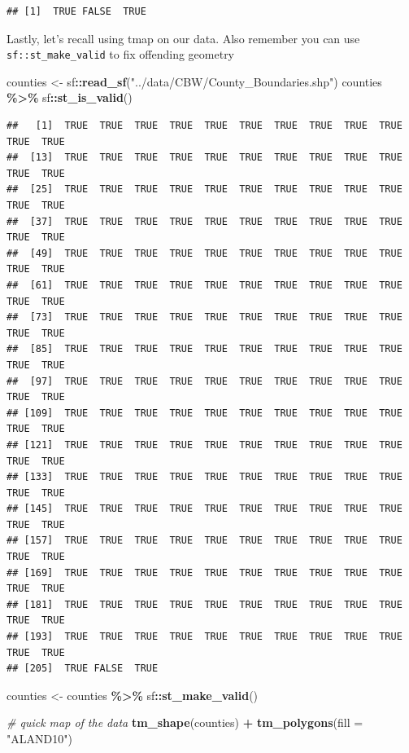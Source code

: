 \documentclass[]{article}
\newenvironment{Shaded}{\begin{snugshade}}{\end{snugshade}}
\newcommand{\AttributeTok}[1]{\textcolor[rgb]{0.13,0.29,0.53}{#1}}
\newcommand{\CommentTok}[1]{\textcolor[rgb]{0.56,0.35,0.01}{\textit{#1}}}
\newcommand{\FunctionTok}[1]{\textcolor[rgb]{0.13,0.29,0.53}{\textbf{#1}}}
\newcommand{\NormalTok}[1]{#1}
\newcommand{\OtherTok}[1]{\textcolor[rgb]{0.56,0.35,0.01}{#1}}
\newcommand{\SpecialCharTok}[1]{\textcolor[rgb]{0.81,0.36,0.00}{\textbf{#1}}}
\newcommand{\StringTok}[1]{\textcolor[rgb]{0.31,0.60,0.02}{#1}}
\begin{document}
\begin{verbatim}
## [1]  TRUE FALSE  TRUE
\end{verbatim}

Lastly, let's recall using tmap on our data. Also remember you can use
\texttt{sf::st\_make\_valid} to fix offending geometry

\begin{Shaded}
\begin{Highlighting}[]
\NormalTok{counties }\OtherTok{\textless{}{-}}\NormalTok{ sf}\SpecialCharTok{::}\FunctionTok{read\_sf}\NormalTok{(}\StringTok{"../data/CBW/County\_Boundaries.shp"}\NormalTok{)}
\NormalTok{counties }\SpecialCharTok{\%\textgreater{}\%}\NormalTok{ sf}\SpecialCharTok{::}\FunctionTok{st\_is\_valid}\NormalTok{()}
\end{Highlighting}
\end{Shaded}

\begin{verbatim}
##   [1]  TRUE  TRUE  TRUE  TRUE  TRUE  TRUE  TRUE  TRUE  TRUE  TRUE  TRUE  TRUE
##  [13]  TRUE  TRUE  TRUE  TRUE  TRUE  TRUE  TRUE  TRUE  TRUE  TRUE  TRUE  TRUE
##  [25]  TRUE  TRUE  TRUE  TRUE  TRUE  TRUE  TRUE  TRUE  TRUE  TRUE  TRUE  TRUE
##  [37]  TRUE  TRUE  TRUE  TRUE  TRUE  TRUE  TRUE  TRUE  TRUE  TRUE  TRUE  TRUE
##  [49]  TRUE  TRUE  TRUE  TRUE  TRUE  TRUE  TRUE  TRUE  TRUE  TRUE  TRUE  TRUE
##  [61]  TRUE  TRUE  TRUE  TRUE  TRUE  TRUE  TRUE  TRUE  TRUE  TRUE  TRUE  TRUE
##  [73]  TRUE  TRUE  TRUE  TRUE  TRUE  TRUE  TRUE  TRUE  TRUE  TRUE  TRUE  TRUE
##  [85]  TRUE  TRUE  TRUE  TRUE  TRUE  TRUE  TRUE  TRUE  TRUE  TRUE  TRUE  TRUE
##  [97]  TRUE  TRUE  TRUE  TRUE  TRUE  TRUE  TRUE  TRUE  TRUE  TRUE  TRUE  TRUE
## [109]  TRUE  TRUE  TRUE  TRUE  TRUE  TRUE  TRUE  TRUE  TRUE  TRUE  TRUE  TRUE
## [121]  TRUE  TRUE  TRUE  TRUE  TRUE  TRUE  TRUE  TRUE  TRUE  TRUE  TRUE  TRUE
## [133]  TRUE  TRUE  TRUE  TRUE  TRUE  TRUE  TRUE  TRUE  TRUE  TRUE  TRUE  TRUE
## [145]  TRUE  TRUE  TRUE  TRUE  TRUE  TRUE  TRUE  TRUE  TRUE  TRUE  TRUE  TRUE
## [157]  TRUE  TRUE  TRUE  TRUE  TRUE  TRUE  TRUE  TRUE  TRUE  TRUE  TRUE  TRUE
## [169]  TRUE  TRUE  TRUE  TRUE  TRUE  TRUE  TRUE  TRUE  TRUE  TRUE  TRUE  TRUE
## [181]  TRUE  TRUE  TRUE  TRUE  TRUE  TRUE  TRUE  TRUE  TRUE  TRUE  TRUE  TRUE
## [193]  TRUE  TRUE  TRUE  TRUE  TRUE  TRUE  TRUE  TRUE  TRUE  TRUE  TRUE  TRUE
## [205]  TRUE FALSE  TRUE
\end{verbatim}

\begin{Shaded}
\begin{Highlighting}[]
\NormalTok{counties }\OtherTok{\textless{}{-}}\NormalTok{ counties }\SpecialCharTok{\%\textgreater{}\%}\NormalTok{ sf}\SpecialCharTok{::}\FunctionTok{st\_make\_valid}\NormalTok{()}

\CommentTok{\# quick map of the data}
\FunctionTok{tm\_shape}\NormalTok{(counties) }\SpecialCharTok{+} \FunctionTok{tm\_polygons}\NormalTok{(}\AttributeTok{fill =} \StringTok{"ALAND10"}\NormalTok{)}
\end{Highlighting}
\end{Shaded}
\end{document}
